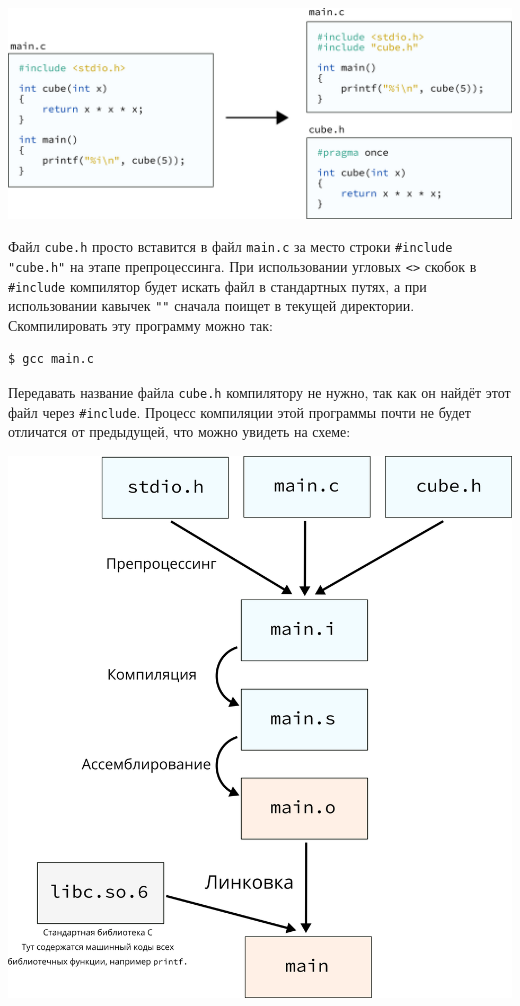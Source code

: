 \documentclass{article}
\begin{document}
\begin{center}
\includegraphics[scale=0.85]{../images/02main_cube_include.png}
\end{center}
Файл \texttt{cube.h} просто вставится в файл \texttt{main.c} за место строки \texttt{\#include "cube.h"} на этапе препроцессинга. При использовании угловых \texttt{<>} скобок в \texttt{\#include} компилятор будет искать файл в стандартных путях, а при использовании кавычек \texttt{"{}"} сначала поищет в текущей директории. 
Скомпилировать эту программу можно так:
\begin{lstlisting}[style=csMiptBash]
$ gcc main.c
\end{lstlisting}
Передавать название файла \texttt{cube.h} компилятору не нужно, так как он найдёт этот файл через \texttt{\#include}. Процесс компиляции этой программы почти не будет отличатся от предыдущей, что можно увидеть на схеме:\\

\begin{center}
\includegraphics[scale=0.7]{../images/03stages_cube_include.png}
\end{center}
\end{document}
